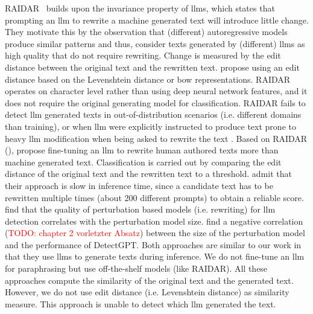 RAIDAR~\cite{mao_raidar_2024} builds upon the invariance property of \acp{llm}, 
which states that prompting an \ac{llm} to rewrite a machine generated text will introduce little change.
They motivate this by the observation that (different) autoregressive models produce similar patterns and thus, 
consider texts generated by (different) \acp{llm} as high quality that do not require rewriting.
Change is measured by the edit distance between the original text and the rewritten text. 
\citet{mao_raidar_2024} propose using an edit distance based on the Levenshtein distance or \ac{bow} representations.
RAIDAR operates on character level rather than using deep neural network features, and it does not require the original generating model for classification. 
RAIDAR fails to detect \ac{llm} generated texts in out-of-distribution scenarios (i.e. different domains than training), 
or when \ac{llm} were explicitly instructed to produce text prone to heavy \ac{llm} modification when being asked to rewrite the text \cite{li_learning_2025}.
Based on RAIDAR (\cite{mao_raidar_2024}), \citet{li_learning_2025} propose fine-tuning an \ac{llm} to rewrite human authored texts more than machine generated text.
Classification is carried out by comparing the edit distance of the original text and the rewritten text to a threshold.
\citet{li_learning_2025} admit that their approach is slow in inference time, 
since a candidate text has to be rewritten multiple times (about 200 different prompts) to obtain a reliable score.
\citet{mao_raidar_2024} find that the quality of perturbation based models (i.e. rewriting) for \ac{llm} detection correlates with the perturbation model size.
\citet{mitchell_detectgpt_2023} find a negative correlation (\textcolor{red}{TODO: chapter 2 vorletzter Absatz}) between the size of the perturbation model and the performance of DetectGPT.
Both approaches are similar to our work in that they use \acp{llm} to generate texts during inference.
We do not fine-tune an \ac{llm} for paraphrasing but use off-the-shelf models (like RAIDAR).
All these approaches compute the similarity of the original text and the generated text.
However, we do not use edit distance (i.e. Levenshtein distance) as similarity measure.
This approach is unable to detect which \ac{llm} generated the text.

